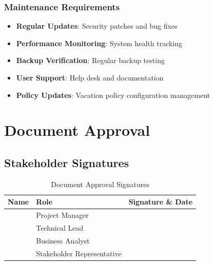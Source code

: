 \documentclass[12pt,a4paper]{article}
\begin{document}
\subsubsection{Maintenance Requirements}
\begin{itemize}
    \item \textbf{Regular Updates}: Security patches and bug fixes
    \item \textbf{Performance Monitoring}: System health tracking
    \item \textbf{Backup Verification}: Regular backup testing
    \item \textbf{User Support}: Help desk and documentation
    \item \textbf{Policy Updates}: Vacation policy configuration management
\end{itemize}

\section{Document Approval}

\subsection{Stakeholder Signatures}
\begin{table}[H]
\centering
\begin{tabular}{|p{4cm}|p{4cm}|p{4cm}|}
\hline
\textbf{Name} & \textbf{Role} & \textbf{Signature \& Date} \\
\hline
 & Project Manager &  \\
\hline
 & Technical Lead &  \\
\hline
 & Business Analyst &  \\
\hline
 & Stakeholder Representative &  \\
\hline
\end{tabular}
\caption{Document Approval Signatures}
\end{table}
\end{document}
